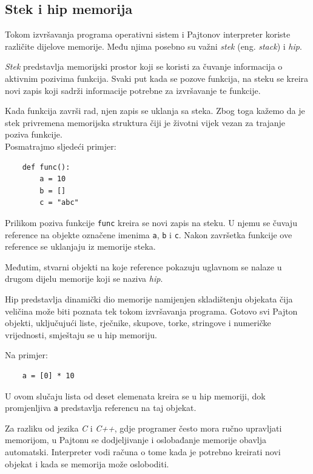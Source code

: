\subsection{Stek i hip memorija}

Tokom izvršavanja programa operativni sistem i Pajtonov interpreter koriste različite dijelove memorije. Među njima posebno su važni \textit{stek} (eng. \textit{stack}) i \textit{hip}.

\textit{Stek} predstavlja memorijski prostor koji se koristi za čuvanje informacija o aktivnim pozivima funkcija. Svaki put kada se pozove funkcija, na steku se kreira novi zapis koji sadrži informacije potrebne za izvršavanje te funkcije.

Kada funkcija završi rad, njen zapis se uklanja sa steka. Zbog toga kažemo da je stek privremena memorijska struktura čiji je životni vijek vezan za trajanje poziva funkcije.\\

Posmatrajmo sljedeći primjer:

\begin{verbatim}
	def func():
	    a = 10
	    b = []
	    c = "abc"
\end{verbatim}

Prilikom poziva funkcije \texttt{func} kreira se novi zapis na steku. U njemu se čuvaju reference na objekte označene imenima \texttt{a}, \texttt{b} i \texttt{c}. Nakon završetka funkcije ove reference se uklanjaju iz memorije steka.

Međutim, stvarni objekti na koje reference pokazuju uglavnom se nalaze u drugom dijelu memorije koji se naziva \textit{hip}.

Hip predstavlja dinamički dio memorije namijenjen skladištenju objekata čija veličina može biti poznata tek tokom izvršavanja programa. Gotovo svi Pajton objekti, uključujući liste, rječnike, skupove, torke, stringove i numeričke vrijednosti, smještaju se u hip memoriju.

Na primjer:
\begin{verbatim}
	a = [0] * 10
\end{verbatim}

U ovom slučaju lista od deset elemenata kreira se u hip memoriji, dok promjenljiva \texttt{a} predstavlja referencu na taj objekat.

Za razliku od jezika \textit{C} i \textit{C++}, gdje programer često mora ručno upravljati memorijom, u Pajtonu se dodjeljivanje i oslobađanje memorije obavlja automatski. Interpreter vodi računa o tome kada je potrebno kreirati novi objekat i kada se memorija može osloboditi.

